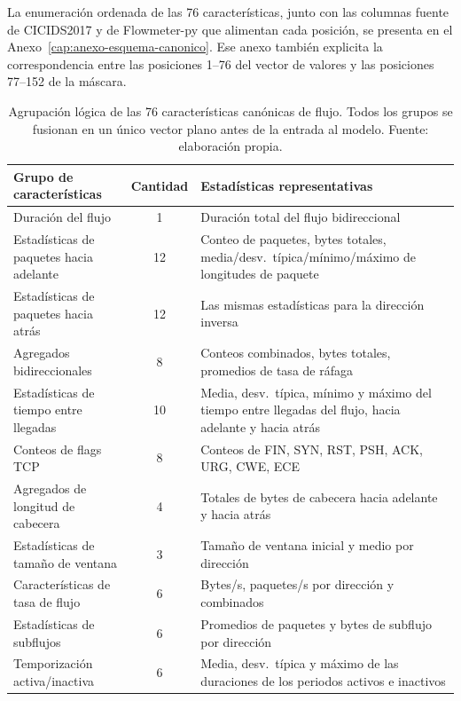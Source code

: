 La enumeración ordenada de las 76 características, junto con las columnas fuente de CICIDS2017 y de Flowmeter-py que alimentan cada posición, se presenta en el Anexo~\ref{cap:anexo-esquema-canonico}. Ese anexo también explicita la correspondencia entre las posiciones 1--76 del vector de valores y las posiciones 77--152 de la máscara.

\begin{table}[htbp]
\centering
\small
\setlength{\tabcolsep}{4pt}
\begin{tabular}{p{4.1cm}cp{7.2cm}}
\toprule
Grupo de características & Cantidad & Estadísticas representativas \\
\midrule
Duración del flujo & 1 & Duración total del flujo bidireccional \\
Estadísticas de paquetes hacia adelante & 12 & Conteo de paquetes, bytes totales, media/desv.\ típica/mínimo/máximo de longitudes de paquete \\
Estadísticas de paquetes hacia atrás & 12 & Las mismas estadísticas para la dirección inversa \\
Agregados bidireccionales & 8 & Conteos combinados, bytes totales, promedios de tasa de ráfaga \\
Estadísticas de tiempo entre llegadas & 10 & Media, desv.\ típica, mínimo y máximo del tiempo entre llegadas del flujo, hacia adelante y hacia atrás \\
Conteos de flags TCP & 8 & Conteos de FIN, SYN, RST, PSH, ACK, URG, CWE, ECE \\
Agregados de longitud de cabecera & 4 & Totales de bytes de cabecera hacia adelante y hacia atrás \\
Estadísticas de tamaño de ventana & 3 & Tamaño de ventana inicial y medio por dirección \\
Características de tasa de flujo & 6 & Bytes/s, paquetes/s por dirección y combinados \\
Estadísticas de subflujos & 6 & Promedios de paquetes y bytes de subflujo por dirección \\
Temporización activa/inactiva & 6 & Media, desv.\ típica y máximo de las duraciones de los periodos activos e inactivos \\
\bottomrule
\end{tabular}
\caption[Agrupación lógica de las 76 características canónicas]{Agrupación lógica de las 76 características canónicas de flujo. Todos los grupos se fusionan en un único vector plano antes de la entrada al modelo. Fuente: elaboración propia.}
\label{tab:canonical-groups}
\end{table}

